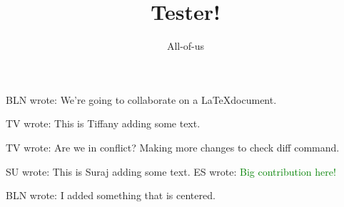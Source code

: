 \documentclass[12pt]{article}
\title{Tester!}
\author{All-of-us}
\newcommand{\bln}[1]{BLN wrote: \textcolor{red!70!blue!70}{#1}}
\newcommand{\tv}[1]{TV wrote: \textcolor{blue!70}{#1}}
\newcommand{\su}[1]{SU wrote: \textcolor{green!70}{#1}}
\newcommand{\es}[1]{ES wrote: \textcolor{green}{#1}}
\begin{document}
\maketitle

\bln{We're going to collaborate on a \LaTeX document.}

\tv{This is Tiffany adding some text.}

\tv{Are we in conflict? Making more changes to check diff command.}

\su{This is Suraj adding some text.}
\es{Big contribution here!}

\begin{center}
  \bln{I added something that is centered.}
\end{center}
\end{document}
